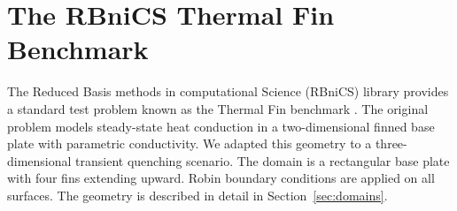 \section{The RBniCS Thermal Fin Benchmark}
\label{sec:rbnics_theory}

The Reduced Basis methods in computational Science (RBniCS) library provides
a standard test problem known as the Thermal Fin benchmark \cite{rozza2008}.
The original problem models steady-state heat conduction in a two-dimensional
finned base plate with parametric conductivity.
We adapted this geometry to a three-dimensional transient quenching scenario.
The domain is a rectangular base plate with four fins extending upward.
Robin boundary conditions are applied on all surfaces.
The geometry is described in detail in Section~\ref{sec:domains}.
